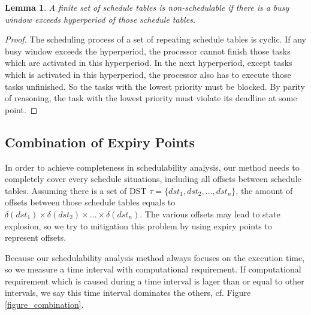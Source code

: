 \documentclass[conference]{IEEEtran}
\newtheorem{lemma}{Lemma}
\begin{document}
\begin{lemma}
  A finite set of schedule tables is non-schedulable if there is a busy window exceeds hyperperiod of those schedule tables.
\end{lemma}\label{lemma_hyperperiod}
\begin{proof}
  The scheduling process of a set of repeating schedule tables is cyclic. If any busy window exceeds the hyperperiod, the processor cannot finish those tasks which are activated in this hyperperiod. In the next hyperperiod, except tasks which is activated in this hyperperiod, the processor also has to execute those tasks unfinished. So the tasks with the lowest priority must be blocked. By parity of reasoning, the task with the lowest priority must violate its deadline at some point.
\end{proof}
\subsection{Combination of Expiry Points}\label{section_combination}
In order to achieve completeness in schedulability analysis, our method needs to completely cover every schedule situations, including all offsets between schedule tables. Assuming there is a set of DST $\tau=\{dst_1,dst_2,\dots,dst_n\}$, the amount of offsets between those schedule tables equals to $\delta(dst_1)\times\delta(dst_2)\times\dots\times\delta(dst_n)$. The various offsets may lead to state explosion, so we try to mitigation this problem by using expiry points to represent offsets.

Because our schedulability analysis method always focuses on the execution time, so we measure a time interval with computational requirement. If computational requirement which is caused during a time interval is lager than or equal to other intervals, we say this time interval dominates the others, cf. Figure \ref{figure_combination}.
\end{document}
